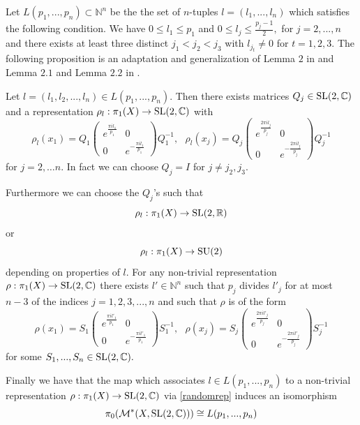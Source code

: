  Let $L(p_1,...,p_n) \subset \mathbb{N}^{n}$ be the the set of $n$-tuples $l=(l_1,...,l_n)$ which satisfies the following condition. We have $0\leq l_1 \leq p_1$ and $0\leq l_j \leq \frac{p_j-1}{2},$ for $j=2,...,n$ and there exists at least three distinct ${j_1}<{j_2}<{j_3}$ with $l_{j_t}\not=0$ for $t=1,2,3.$
The following proposition is an adaptation and generalization of Lemma $2$ in \cite{BodenCurtis06} and Lemma $2.1$ and Lemma  $2.2$ in \cite{FintushelStern90}. 

 \begin{proposition} \label{rho_l}
 Let $l=(l_1,l_2,...,l_n) \in L(p_1,...,p_n).$ Then there exists matrices $Q_j \in \operatorname{SL}(2,\mathbb{C})$ and a representation 
$ \rho_l: \pi_1(X) \rightarrow \operatorname{SL}(2,\mathbb{C})$  with
\begin{equation} \label{X_1}
\rho_l(x_1)= Q_1\begin{pmatrix} e^{\frac{\pi i l_1}{p_1}} & 0
\\ 0 &  e^{-\frac{\pi i l_1}{p_1}} \end{pmatrix}Q_1^{-1}, \ \ \   \rho_l(x_j)= Q_j\begin{pmatrix} e^{\frac{2\pi i l_j}{p_j}} & 0
\\ 0 &  e^{-\frac{2\pi i l_j}{p_j}} \end{pmatrix}Q_j^{-1}
\end{equation}
for $j=2,\ldots n$. In fact we can choose $Q_j=I$ for $j\not=j_2,j_3.$ 

Furthermore we can choose the $Q_j$'s such that 
$$ \rho_l : \pi_1(X) \rightarrow \operatorname{SL}(2,\mathbb{R})$$ 
or
$$ \rho_l: \pi_1(X) \rightarrow \operatorname{SU}(2)$$ 
depending on properties of $l$.
For any non-trivial representation $\rho: \pi_1(X) \rightarrow \operatorname{SL}(2,\mathbb{C})$ there exists $l' \in \mathbb{N}^n$ such that $p_j$ divides $ l'_j$ for at most $n-3$ of the indices $j=1,2,3,...,n$ and such that $\rho$ is of the form 
\begin{equation} \label{randomrep}
\rho(x_1)= S_1\begin{pmatrix} e^{\frac{\pi i l'_1}{p_1}} & 0
\\ 0 &  e^{-\frac{\pi il'_1 }{p_1}} \end{pmatrix}S_1^{-1}, \ \ \   \rho(x_j)= S_j\begin{pmatrix} e^{\frac{2\pi i l'_j}{p_j}} & 0
\\ 0 &  e^{-\frac{2\pi i l'_j}{p_j}} \end{pmatrix}S_j^{-1}
\end{equation}
for some $S_1,...,S_n \in \operatorname{SL}(2,\mathbb{C}).$

Finally we have that the map which associates $l\in L(p_1,...,p_n)$ to a non-trivial representation $\rho : \pi_1(X) \rightarrow \operatorname{SL}(2,\mathbb{C})$ via \eqref{randomrep} induces an isomorphism
$$\pi_0(\mathcal{M}^*(X,\operatorname{SL}(2,\mathbb{C}))) \cong L(p_1,...,p_n)$$
\end{proposition}

